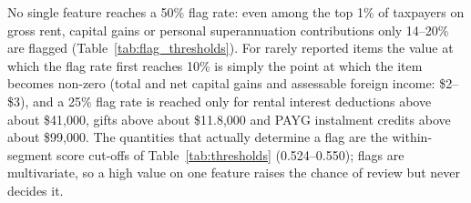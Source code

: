 No single feature reaches a 50\% flag rate: even among the top 1\% of taxpayers on gross rent, capital gains or personal superannuation contributions only 14--20\% are flagged (Table~\ref{tab:flag_thresholds}). For rarely reported items the value at which the flag rate first reaches 10\% is simply the point at which the item becomes non-zero (total and net capital gains and assessable foreign income: \$2--\$3), and a 25\% flag rate is reached only for rental interest deductions above about \$41,000, gifts above about \$11.8,000 and PAYG instalment credits above about \$99,000. The quantities that actually determine a flag are the within-segment score cut-offs of Table~\ref{tab:thresholds} (0.524--0.550); flags are multivariate, so a high value on one feature raises the chance of review but never decides it.

\begin{table}[H]
    \centering
    \caption{Empirical single-feature flag thresholds (pooled): the feature value above which the flag rate reaches 10\%, 25\% and 50\%, and the flag rate among the top 1\% of each feature.}
    \label{tab:flag_thresholds}
    \footnotesize
\end{table}

